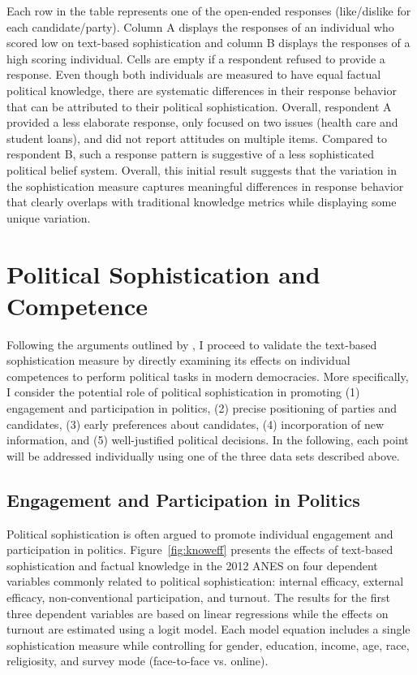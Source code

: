 \documentclass[12pt]{article}
\begin{document}
Each row in the table represents one of the open-ended responses (like/dislike for each candidate/party). Column A displays the responses of an individual who scored low on text-based sophistication and column B displays the responses of a high scoring individual. Cells are empty if a respondent refused to provide a response. Even though both individuals are measured to have equal factual political knowledge, there are systematic differences in their response behavior that can be attributed to their political sophistication. Overall, respondent A provided a less elaborate response, only focused on two issues (health care and student loans), and did not report attitudes on multiple items. Compared to respondent B, such a response pattern is suggestive of a less sophisticated political belief system. Overall, this initial result suggests that the variation in the sophistication measure captures meaningful differences in response behavior that clearly overlaps with traditional knowledge metrics while displaying some unique variation.

\section*{Political Sophistication and Competence}

Following the arguments outlined by \citet{lupia2006elitism,lupia2015uninformed}, I proceed to validate the text-based sophistication measure by directly examining its effects on individual competences to perform political tasks in modern democracies. More specifically, I consider the potential role of political sophistication in promoting (1) engagement and participation in politics, (2) precise positioning of parties and candidates, (3) early preferences about candidates, (4) incorporation of new information, and (5) well-justified political decisions. In the following, each point will be addressed individually using one of the three data sets described above.


\subsection*{Engagement and Participation in Politics}

Political sophistication is often argued to promote individual engagement and participation in politics. Figure~\ref{fig:knoweff} presents the effects of text-based sophistication and factual knowledge in the 2012 ANES on four dependent variables commonly related to political sophistication: internal efficacy, external efficacy, non-conventional participation, and turnout. The results for the first three dependent variables are based on linear regressions while the effects on turnout are estimated using a logit model. Each model equation includes a single sophistication measure while controlling for gender, education, income, age, race, religiosity, and survey mode (face-to-face vs. online). 
\end{document}
